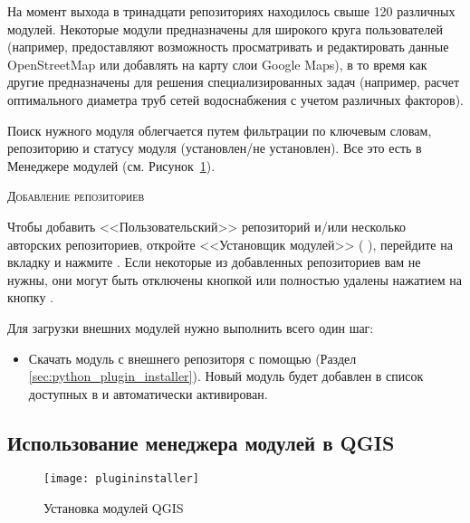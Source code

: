 На момент выхода \qg \CURRENT в тринадцати репозиториях находилось свыше
120 различных модулей. Некоторые модули предназначены для широкого круга
пользователей (например, предоставляют возможность просматривать и
редактировать данные OpenStreetMap или добавлять на карту слои Google Maps),
в то время как другие предназначены для решения специализированных задач
(например, расчет оптимального диаметра труб сетей водоснабжения с учетом
различных факторов).

Поиск нужного модуля облегчается путем фильтрации по ключевым словам, репозиторию
и статусу модуля (установлен/не установлен). Все это есть в Менеджере
модулей (см. Рисунок~\ref{fig:plugininstaller}).

\begin{Tip} \caption{\textsc{Добавление репозиториев}}
Чтобы добавить <<Пользовательский>> репозиторий и/или несколько авторских
репозиториев, откройте <<Установщик модулей>> ( \arrow
{}), перейдите на
вкладку  и нажмите .
Если некоторые из добавленных репозиториев вам не нужны, они могут быть
отключены кнопкой  или полностью удалены нажатием
на кнопку .
\end{Tip}

Для загрузки внешних модулей нужно выполнить всего один шаг:

\begin{itemize}[label=--]
\item Скачать модуль с внешнего репозиторя с помощью
 (Раздел \ref{sec:python_plugin_installer}).
Новый модуль будет добавлен в список доступных в
 и автоматически активирован.
\end{itemize}

\subsection{Использование менеджера модулей в QGIS}\label{sec:python_plugin_installer}

\begin{figure}[ht]
   \centering
   \texttt{[image: plugininstaller]}
   \caption{Установка модулей QGIS \wincaption}\label{fig:plugininstaller}\smallskip
\end{figure}

